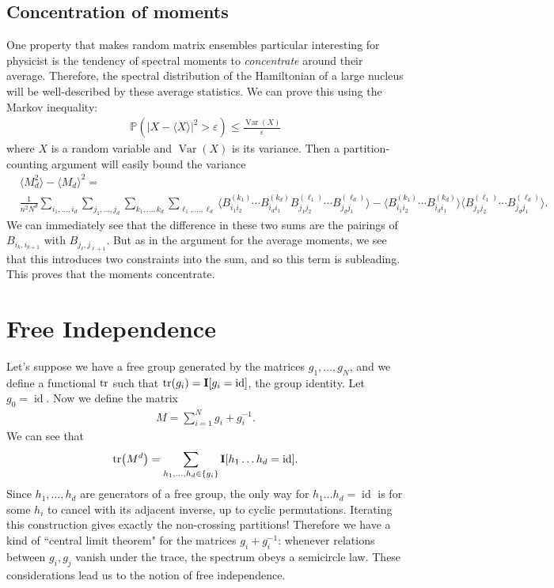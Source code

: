 \documentclass[11pt]{article}
\newcommand{\Var}{\operatorname{Var}}
\newcommand{\id}{\operatorname{id}}
\renewcommand{\epsilon}{\varepsilon}
\theoremstyle{definition}
\begin{document}
\subsection{Concentration of moments}
One property that makes random matrix ensembles particular interesting for physicist is the tendency of spectral moments to \emph{concentrate} around their average. Therefore, the spectral distribution of the Hamiltonian of a large nucleus will be well-described by these average statistics. We can prove this using the Markov inequality:
\begin{align}
\mathbb P(|X - \langle X \rangle|^2 > \epsilon) \leq \frac{\Var(X)}{\epsilon}
\end{align}
where $X$ is a random variable and $\Var(X)$ is its variance. Then a partition-counting argument will easily bound the variance
\begin{align}
&\langle M_d^2 \rangle - \langle M_d \rangle^2 =\\
&\frac{1}{n^2N^d}\sum_{i_1, \ldots, i_d}\sum_{j_1, \ldots, j_d}\sum_{k_1, \ldots, k_d} \sum_{\ell_1, \ldots, \ell_d} \langle B^{(k_1)}_{i_1i_2} \cdots B_{i_d i_{1}}^{(k_d)} B^{(\ell_1)}_{j_1j_2} \cdots B_{j_d j_{1}}^{(\ell_d)} \rangle - \langle B^{(k_1)}_{i_1i_2} \cdots B_{i_d i_{1}}^{(k_d)}\rangle \langle B^{(\ell_1)}_{j_1j_2} \cdots B_{j_d j_{1}}^{(\ell_d)} \rangle .
\end{align}
We can immediately see that the difference in these two sums are the pairings of $B_{i_k, i_{k+1}}$ with $B_{j_\ell, j_{\ell + 1}}$. But as in the argument for the average moments, we see that this introduces two constraints into the sum, and so this term is subleading. This proves that the moments concentrate.

\section{Free Independence}
Let's suppose we have a free group generated by the matrices $g_1, \ldots, g_N$, and we define a functional $\tr$ such that $\tr(g_i) = \mathbf{I}[g_i = \id]$, the group identity. Let $g_0 = \id$. Now we define the matrix 
\begin{align}
M = \sum_{i=1}^N g_i + g_i^{-1}.
\end{align}
We can see that
\begin{align}
\tr(M^d) = \sum_{h_1,\ldots, h_d \in \{g_i\}} \mathbf{I}[h_1\ldots h_d = \id].
\end{align}
Since $h_1, \ldots, h_d$ are generators of a free group, the only way for $h_1 \ldots h_d = \id$ is for some $h_i$ to cancel with its adjacent inverse, up to cyclic permutations. Iterating this construction gives exactly the non-crossing partitions! Therefore we have a kind of ``central limit theorem" for the matrices $g_i + g_{i}^{-1}$: whenever relations between $g_i, g_j$ vanish under the trace, the spectrum obeys a semicircle law. These considerations lead us to the notion of free independence.
\end{document}
